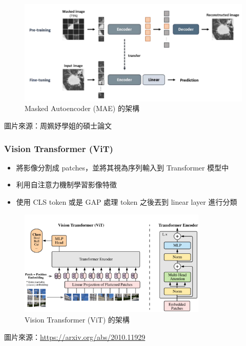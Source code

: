 \documentclass[xcolor=dvipsnames]{beamer}
\begin{document}
    \begin{frame}
        \begin{figure}
            \centering
            \includegraphics[width=1\textwidth]{src/MAE.png}
            \caption{Masked Autoencoder (MAE) 的架構}
            \label{fig:mae_architecture}
        \end{figure}
        圖片來源：周姵妤學姐的碩士論文
    \end{frame}

    \begin{frame}
        \frametitle{Vision Transformer (ViT)}
        \begin{itemize}
            \item 將影像分割成 patches，並將其視為序列輸入到 Transformer 模型中
            \item 利用自注意力機制學習影像特徵
            \item 使用 CLS token 或是 GAP 處理 token 之後丟到 linear layer 進行分類
        \end{itemize}
    \end{frame}

    \begin{frame}
        \begin{figure}
            \centering
            \includegraphics[width=0.8\textwidth]{src/ViT.png}
            \caption{Vision Transformer (ViT) 的架構}
            \label{fig:vit_architecture}
        \end{figure}
        圖片來源：\url{https://arxiv.org/abs/2010.11929}
    \end{frame}
\end{document}
